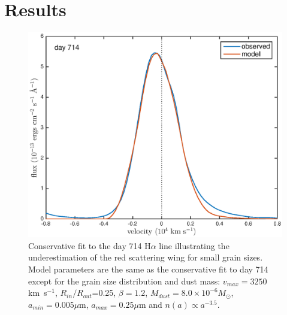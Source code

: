 \documentclass[useAMS,usenatbib,usegraphicx]{mnras}
\begin{document}
\section{Results}
\label{results}

\begin{figure}
\begin{center}
\includegraphics[trim =37 10 45 15,clip=true,scale=0.51]{smooth/d714Ha_smooth_amC_MRN}
\caption{Conservative fit to the day 714 H$\alpha$ line illustrating the 
underestimation of the red scattering wing for small grain sizes.  Model 
parameters are the same as the conservative fit to day 714 except for the 
grain size distribution and dust mass:  $v_{max}=3250$ km~s$^{-1}$, 
$R_{in}/R_{out}$=0.25, $\beta = 1.2$, $M_{dust}=8.0 \times 10^{-6} 
M_{\odot}$, $a_{min}=0.005 \mu$m, $a_{max}=0.25 \mu$m and $n(a) \propto 
a^{-3.5}$.}
\label{MRN}
\end{center}
\end{figure}
\end{document}
